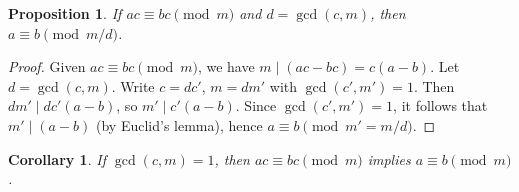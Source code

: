 \documentclass[12pt,openany]{book}
\theoremstyle{definition}
\theoremstyle{plain}
\newtheorem{proposition}{Proposition}[chapter]
\newtheorem{corollary}{Corollary}[chapter]
\theoremstyle{remark}
\begin{document}
\begin{proposition}
  If $a c \equiv b c \pmod{m}$ and $d = \gcd(c, m)$, then $a \equiv b \pmod{m/d}$.
\end{proposition}

\begin{proof}
  Given $a c \equiv b c \pmod{m}$, we have $m \mid (a c - b c) = c (a - b)$. Let $d = \gcd(c, m)$. Write $c = d c'$, $m = d m'$ with $\gcd(c', m') = 1$. Then $d m' \mid d c' (a - b)$, so $m' \mid c' (a - b)$. Since $\gcd(c', m') = 1$, it follows that $m' \mid (a - b)$ (by Euclid's lemma), hence $a \equiv b \pmod{m' = m/d}$.
\end{proof}

\begin{corollary}
  If $\gcd(c, m) = 1$, then $a c \equiv b c \pmod{m}$ implies $a \equiv b \pmod{m}$.
\end{corollary}
\end{document}

